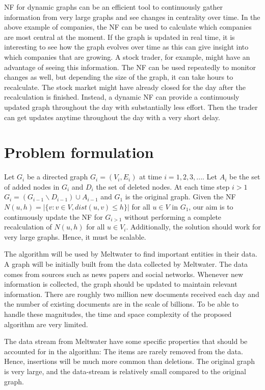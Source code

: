 NF for dynamic graphs can be an efficient tool to continuously gather information from very large graphs and see changes in centrality over time. In the above example of companies, the NF can be used to calculate which companies are most central at the moment. If the graph is updated in real time, it is interesting to see how the graph evolves over time as this can give insight into which companies that are growing. A stock trader, for example, might have an advantage of seeing this information. The NF can be used repeatedly to monitor changes as well, but depending the size of the graph, it can take hours to recalculate. The stock market might have already closed for the day after the recalculation is finished. Instead, a dynamic NF can provide a continuously updated graph throughout the day with substantially less effort. Then the trader can get updates anytime throughout the day with a very short delay.

\section{Problem formulation}
Let $G_i$ be a directed graph $G_i = (V_i,E_i)$ at time $i = 1,2,3,...$.
Let $A_i$ be the set of added nodes in $G_i$ and $D_i$ the set of deleted nodes. 
At each time step $i > 1$ $G_i = (G_{i-1} \backslash D_{i-1}) \cup A_{i-1}$ and $G_1$ is the original graph. Given the NF $N(u, h) = |\{v : v \in V, dist(u,v) \leq h \}|$ for all $u \in V$ in $G_1$, our aim is to continuously update the NF for $G_{i>1}$ without performing a complete recalculation of $N(u, h)$ for all $u \in V_i$. Additionally, the solution should work for very large graphs. Hence, it must be scalable. 

The algorithm will be used by Meltwater to find important entities in their data. A graph will be initially built from the data collected by Meltwater. The data comes from sources such as news papers and social networks. Whenever new information is collected, the graph should be updated to maintain relevant information. There are roughly two million new documents received each day and the number of existing documents are in the scale of billions. To be able to handle these magnitudes, the time and space complexity of the proposed algorithm are very limited.

The data stream from Meltwater have some specific properties that should be accounted for in the algorithm: The items are rarely removed from the data. Hence, insertions will be much more common than deletions. The original graph is very large, and the data-stream is relatively small compared to the original graph. 

